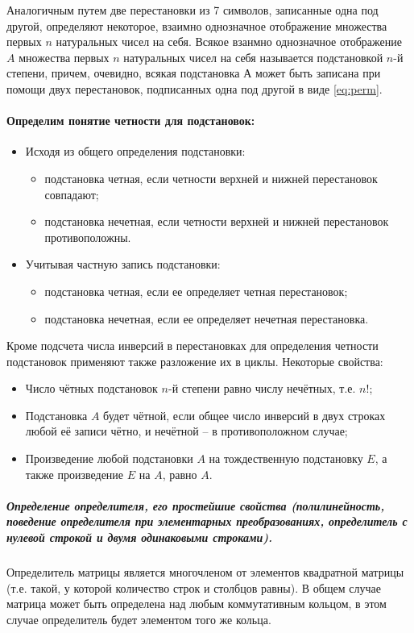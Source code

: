 \documentclass[a4paper,14pt]{article}
\begin{document}
\begin{exmp}
	Аналогичным путем две перестановки из 7 символов, записанные одна под другой, определяют некоторое, взаимно однозначное отображение множества первых $n$ натуральных чисел на себя. Всякое взанмно однозначное отображение $A$ множества первых $n$ натуральных чисел на себя называется подстановкой $n$-й степени, причем, очевидно, всякая подстановка А может быть записана при помощи двух перестановок, подписанных одна под другой в виде \eqref{eq:perm}.
\end{exmp}
\paragraph{Определим понятие четности для подстановок:}
\begin{itemize}
	\item Исходя из общего определения подстановки:
		\begin{itemize}
			\item подстановка четная, если четности верхней и нижней перестановок совпадают;
			\item подстановка нечетная, если четности верхней и нижней перестановок противоположны.
		\end{itemize}
	\item Учитывая частную запись подстановки:
		\begin{itemize}
			\item подстановка четная, если ее определяет четная перестановок;
			\item подстановка нечетная, если ее определяет нечетная перестановка.
		\end{itemize}
\end{itemize}
Кроме подсчета числа инверсий в перестановках для определения четности подстановок применяют также разложение их в циклы.
Некоторые свойства:
\begin{itemize}
	\item Число чётных подстановок $n$-й степени равно числу нечётных, т.е. $n!$;
	\item Подстановка $A$ будет чётной, если общее число инверсий в двух строках любой её записи чётно, и нечётной – в противоположном случае;
	\item Произведение любой подстановки $A$ на тождественную подстановку $E$, а также произведение $E$ на $A$, равно $A$.
\end{itemize}
\subparagraph{Определение определителя, его простейшие свойства (полилинейность, поведение определителя при элементарных преобразованиях, определитель с нулевой строкой и двумя одинаковыми строками).}
Определитель матрицы является многочленом от элементов квадратной матрицы (т.е. такой, у которой количество строк и столбцов равны). В общем случае матрица может быть определена над любым коммутативным кольцом, в этом случае определитель будет элементом того же кольца.
\end{document}
